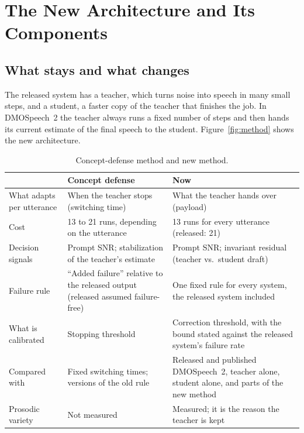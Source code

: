 \documentclass[11pt,a4paper]{article}
\begin{document}
\section{The New Architecture and Its Components}
\label{sec:components}

\subsection*{What stays and what changes}

The released system has a teacher, which turns noise into speech in many small steps, and a student, a faster copy of the teacher that finishes the job. In DMOSpeech~2 the teacher always runs a fixed number of steps and then hands its current estimate of the final speech to the student. Figure~\ref{fig:method} shows the new architecture.



\begin{table}[H]
\centering\small
\caption{Concept-defense method and new method.}
\label{tab:oldnew}
\begin{tabularx}{\textwidth}{@{}P{3.2cm} L L@{}}
\toprule
& \textbf{Concept defense} & \textbf{Now} \\
\midrule
What adapts per utterance & When the teacher stops (switching time) & What the teacher hands over (payload) \\
Cost & 13 to 21 runs, depending on the utterance & 13 runs for every utterance (released: 21) \\
Decision signals & Prompt SNR; stabilization of the teacher's estimate & Prompt SNR; invariant residual (teacher vs.\ student draft) \\
Failure rule & ``Added failure'' relative to the released output (released assumed failure-free) & One fixed rule for every system, the released system included \\
What is calibrated & Stopping threshold & Correction threshold, with the bound stated against the released system's failure rate \\
Compared with & Fixed switching times; versions of the old rule & Released and published DMOSpeech~2, teacher alone, student alone, and parts of the new method \\
Prosodic variety & Not measured & Measured; it is the reason the teacher is kept \\
\bottomrule
\end{tabularx}
\end{table}
\end{document}
